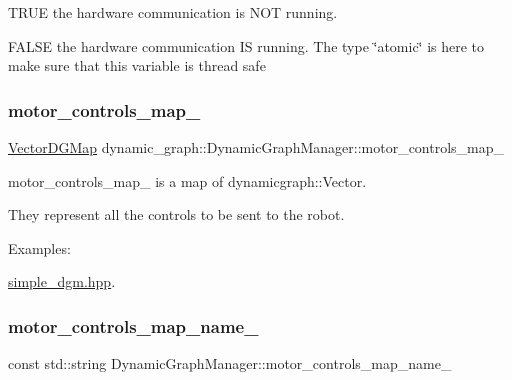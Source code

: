 \begin{DoxyItemize}
\item T\+R\+UE the hardware communication is N\+OT running.
\item F\+A\+L\+SE the hardware communication IS running. The type \char`\"{}atomic\char`\"{} is here to make sure that this variable is thread safe 
\end{DoxyItemize}\mbox{\label{classdynamic__graph_1_1DynamicGraphManager_a03eabd2f08990a1dcc1caa652b701020}} 
\subsubsection{\texorpdfstring{motor\+\_\+controls\+\_\+map\+\_\+}{motor\_controls\_map\_}}
{\footnotesize\ttfamily \hyperlink{namespacedynamic__graph_a51212ed7fa4ae81e7b362a27f09b7ab8}{Vector\+D\+G\+Map} dynamic\+\_\+graph\+::\+Dynamic\+Graph\+Manager\+::motor\+\_\+controls\+\_\+map\+\_\+\hspace{0.3cm}{\ttfamily [protected]}}



motor\+\_\+controls\+\_\+map\+\_\+ is a map of dynamicgraph\+::\+Vector. 

They represent all the controls to be sent to the robot. \begin{Desc}
\item[Examples\+: ]\par
\hyperlink{simple_dgm_8hpp-example}{simple\+\_\+dgm.\+hpp}.\end{Desc}
\mbox{\label{classdynamic__graph_1_1DynamicGraphManager_a056de4d7a49496b2b0812d96d93370d9}} 
\subsubsection{\texorpdfstring{motor\+\_\+controls\+\_\+map\+\_\+name\+\_\+}{motor\_controls\_map\_name\_}}
{\footnotesize\ttfamily const std\+::string Dynamic\+Graph\+Manager\+::motor\+\_\+controls\+\_\+map\+\_\+name\+\_\+\hspace{0.3cm}{\ttfamily [static]}}

